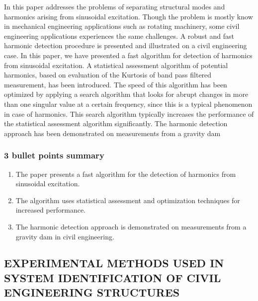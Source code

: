 \documentclass[
  letterpaper,
  DIV=11,
  numbers=noendperiod]{scrreprt}
\providecommand{\tightlist}{%
  \setlength{\itemsep}{0pt}\setlength{\parskip}{0pt}}\usepackage{longtable,booktabs,array}
\begin{document}
In this paper addresses the problems of separating structural modes and
harmonics arising from sinusoidal excitation. Though the problem is
mostly know in mechanical engineering applications such as rotating
machinery, some civil engineering applications experiences the same
challenges. A robust and fast harmonic detection procedure is presented
and illustrated on a civil engineering case. In this paper, we have
presented a fast algorithm for detection of harmonics from sinusoidal
excitation. A statistical assessment algorithm of potential harmonics,
based on evaluation of the Kurtosis of band pass filtered measurement,
has been introduced. The speed of this algorithm has been optimized by
applying a search algorithm that looks for abrupt changes in more than
one singular value at a certain frequency, since this is a typical
phenomenon in case of harmonics. This search algorithm typically
increases the performance of the statistical assessment algorithm
significantly. The harmonic detection approach has been demonstrated on
measurements from a gravity dam

\hypertarget{bullet-points-summary-14}{%
\subsubsection{3 bullet points summary}\label{bullet-points-summary-14}}

\begin{enumerate}
\def\labelenumi{\arabic{enumi}.}
\tightlist
\item
  The paper presents a fast algorithm for the detection of harmonics
  from sinusoidal excitation.
\item
  The algorithm uses statistical assessment and optimization techniques
  for increased performance.
\item
  The harmonic detection approach is demonstrated on measurements from a
  gravity dam in civil engineering.
\end{enumerate}

\hypertarget{experimental-methods-used-in-system-identification-of-civil-engineering-structures}{%
\subsection{EXPERIMENTAL METHODS USED IN SYSTEM IDENTIFICATION OF CIVIL
ENGINEERING
STRUCTURES}\label{experimental-methods-used-in-system-identification-of-civil-engineering-structures}}
\end{document}
